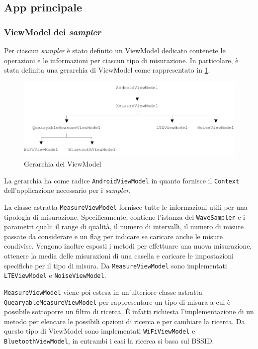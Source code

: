 \subsection{App principale}

\subsubsection{ViewModel dei \textit{sampler}} \label{sec:MeasureViewModel}
Per ciascun \textit{sampler} è stato definito un ViewModel dedicato contenete le operazioni e le informazioni per ciascun tipo di misurazione.
In particolare, è stata definita una gerarchia di ViewModel come rappresentato in \cref{fig:viewmodel_hierarchy}.

\begin{figure}[H]
  \centering
  \includegraphics[width=\textwidth]{./img/viewmodel.pdf}
  \caption{Gerarchia dei ViewModel} \label{fig:viewmodel_hierarchy}
\end{figure}

La gerarchia ha come radice \texttt{AndroidViewModel} in quanto fornisce il \texttt{Context} dell'applicazione necessario per i \textit{sampler}.

La classe astratta \texttt{MeasureViewModel} fornisce tutte le informazioni utili per una tipologia di misurazione. Specificamente, contiene l'istanza del \texttt{WaveSampler} e i parametri quali: il range di qualità, il numero di intervalli, il numero di misure passate da considerare e un flag per indicare se caricare anche le misure condivise.
Vengono inoltre esposti i metodi per effettuare una nuova misurazione, ottenere la media delle misurazioni di una casella e caricare le impostazioni specifiche per il tipo di misura.
Da \texttt{MeasureViewModel} sono implementati \texttt{LTEViewModel} e \texttt{NoiseViewModel}.

\texttt{MeasureViewModel} viene poi estesa in un'ulteriore classe astratta \texttt{QuearyableMeasureViewModel} per rappresentare un tipo di misura a cui è possibile sottoporre un filtro di ricerca. È infatti richiesta l'implementazione di un metodo per elencare le possibili opzioni di ricerca e per cambiare la ricerca. Da questo tipo di ViewModel sono implementati \texttt{WiFiViewModel} e \texttt{BluetoothViewModel}, in entrambi i casi la ricerca si basa sul BSSID.



